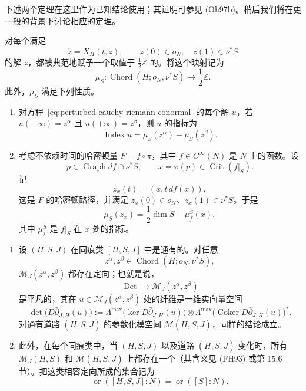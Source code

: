 下述两个定理在这里作为已知结论使用；其证明可参见 (Oh97b)。稍后我们将在更一般的背景下讨论相应的定理。

\begin{theorem}[\termCanonicalGrading{}]
\label{thm:canonical-grading-cotangent-floer}
对每个满足
\[
  \dot z=X_H(t,z),
  \qquad z(0)\in o_N,
  \quad z(1)\in\nu^*S
\]
的解 $z$，都被典范地赋予一个取值于 $\frac12\mathbb Z$ 的\termMaslovIndex{}。将这个映射记为
\[
  \mu_S:\operatorname{Chord}(H;o_N,\nu^*S)
  \longrightarrow\frac12\mathbb Z.
\]
此外，$\mu_S$ 满足下列性质。
\begin{enumerate}[label=(\arabic*)]
  \item 对方程~\eqref{eq:perturbed-cauchy-riemann-conormal} 的每个解 $u$，若 $u(-\infty)=z^\alpha$ 且 $u(+\infty)=z^\beta$，则 $u$ 的\personFredholm{}指标为
  \[
    \operatorname{Index}u
    =\mu_S(z^\alpha)-\mu_S(z^\beta).
  \]
  \item 考虑不依赖时间的哈密顿量 $F=f\circ\pi$，其中 $f\in C^\infty(N)$ 是 $N$ 上的\personMorse{}函数。设
  \[
    p\in\operatorname{Graph}df\cap\nu^*S,
    \qquad
    x=\pi(p)\in\operatorname{Crit}(f|_S).
  \]
  记
  \[
    z_x(t)=(x,t\,df(x)),
  \]
  这是 $F$ 的哈密顿路径，并满足 $z_x(0)\in o_N$、$z_x(1)\in\nu^*S$。于是
  \[
    \mu_S(z_x)=\frac12\dim S-\mu_f^S(x),
  \]
  其中 $\mu_f^S$ 是 $f|_S$ 在 $x$ 处的\personMorse{}指标。
\end{enumerate}
\end{theorem}

\begin{theorem}[\termCoherentOrientation{}]
\label{thm:coherent-orientation-cotangent-floer}
\begin{enumerate}[label=(\arabic*)]
  \item 设 $(H,S,J)$ 在同痕类 $[H,S,J]$ 中是通有的。对任意
  \[
    z^\alpha,z^\beta\in\operatorname{Chord}(H;o_N,\nu^*S),
  \]
  $\mathcal M_J(z^\alpha,z^\beta)$ 都存在定向；也就是说，\termDeterminantBundle{}
  \[
    \operatorname{Det}\longrightarrow\mathcal M_J(z^\alpha,z^\beta)
  \]
  是平凡的，其在 $u\in\mathcal M_J(z^\alpha,z^\beta)$ 处的纤维是一维实向量空间
  \[
    \det\bigl(D\bar\partial_{J,H}(u)\bigr)
    :=\Lambda^{\max}\!\bigl(\ker D\bar\partial_{J,H}(u)\bigr)
    \otimes
    \Lambda^{\max}\!\bigl(\operatorname{Coker}D\bar\partial_{J,H}(u)\bigr)^*.
  \]
  对通有道路 $(\overline H,\overline S,\overline J)$ 的参数化\personFloer{}模空间 $\mathcal M(\overline H,\overline S,\overline J)$，同样的结论成立。
  \item 此外，在每个同痕类中，当 $(H,S,J)$ 以及道路 $(\overline H,\overline S,\overline J)$ 变化时，所有 $\mathcal M_J(H,S)$ 和 $\mathcal M(\overline H,\overline S,\overline J)$ 上都存在一个\termCoherentOrientation{}（其含义见 (FH93) 或第 15.6 节）。把这类相容定向所成的集合记为
  \[
    \operatorname{or}([H,S,J]:N)=\operatorname{or}([S]:N).
  \]
\end{enumerate}
\end{theorem}

